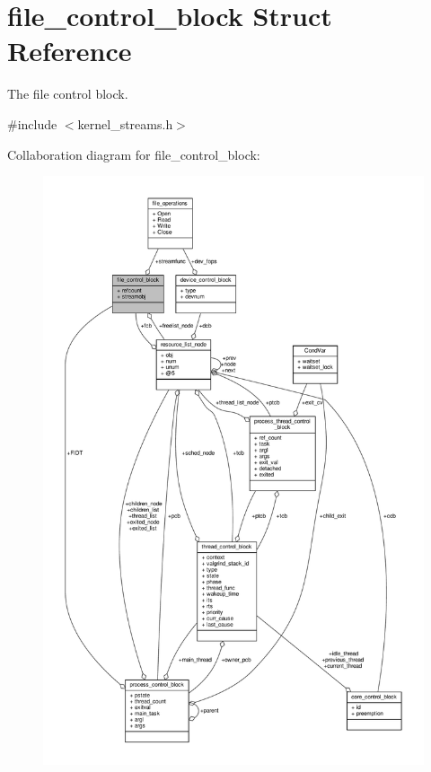 \hypertarget{structfile__control__block}{}\section{file\+\_\+control\+\_\+block Struct Reference}
\label{structfile__control__block}


The file control block.  




{\ttfamily \#include $<$kernel\+\_\+streams.\+h$>$}



Collaboration diagram for file\+\_\+control\+\_\+block\+:\nopagebreak
\begin{figure}[H]
\begin{center}
\leavevmode
\includegraphics[width=350pt]{structfile__control__block__coll__graph}
\end{center}
\end{figure}
